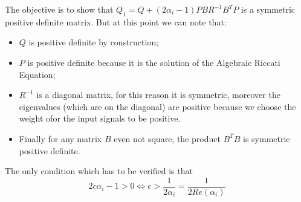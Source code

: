 The objective is to show that $Q_1=Q+(2\alpha_i-1)P B R^{-1}B^T P$ is a symmetric positive definite matrix. But at this point we can note that: 
\begin{itemize}
    \item $Q$ is positive definite by construction; 
    \item $P$ is positive definite because it is the solution of the Algebraic Riccati Equation;
    \item $R^{-1}$ is a diagonal matrix, for this reason it is symmetric, moreover the eigenvalues (which are on the diagonal) are positive because we choose the weight ofor the input signals to be positive.
    \item Finally for any matrix $B$ even not square, the product $B^T B$ is symmetric positive definite.
\end{itemize} 
The only condition which has to be verified is that
\begin{equation}
    2c\alpha_i-1>0 \iff c>\frac{1}{2\alpha_i}=\frac{1}{2Re(\alpha_i)}
\end{equation}

